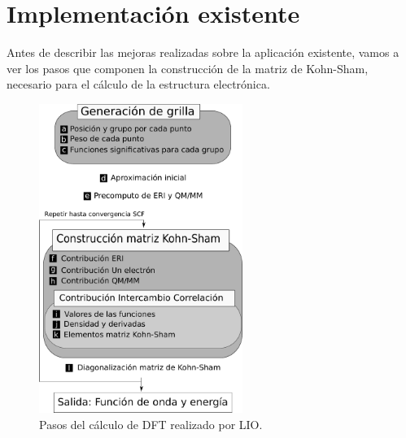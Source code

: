 \section{Implementaci\'on existente}
\label{implementacion}

Antes de describir las mejoras realizadas sobre la aplicaci\'on existente, vamos a ver
los pasos que componen la construcci\'on de la matriz de Kohn-Sham, necesario para el
c\'alculo de la estructura electr\'onica.

\begin{figure}[htbp]
   \centering
   \includegraphics[width=250px]{images/g2g-steps.pdf}
   \caption{Pasos del c\'alculo de DFT realizado por LIO.}
   \label{fig:lio-steps}
\end{figure}

\DeclarePairedDelimiter\abs{\lvert}{\rvert}%
\makeatletter
\let\oldabs\abs
\def\abs{\@ifstar{\oldabs}{\oldabs*}}



